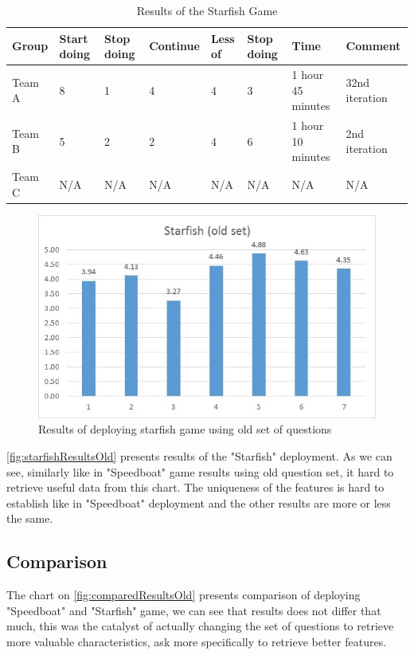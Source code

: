 \begin{table}[!htbp]
	\caption{Results of the Starfish Game}
	\label{tab:groups-starTeamResults}
	\begin{tabularx}{\textwidth}{|X|X|X|X|X|X|X|X|}
	\hline
		Group & Start doing & Stop doing & Continue & Less of &  Stop doing & Time & Comment\\ \hline
		Team A & 8 & 1 & 4 & 4 & 3 & 1 hour 45 minutes & 32nd iteration \\ \hline
		Team B & 5 & 2 & 2 & 4 & 6 & 1 hour 10 minutes & 2nd iteration \\ \hline
        Team C & N/A & N/A & N/A & N/A & N/A & N/A & N/A\\ \hline
	\end{tabularx}
\end{table}

\begin{figure}[!htbp]
\caption{Results of deploying starfish game using old set of questions}
\label{fig:starfishResultsOld}
\centering
\includegraphics[width=1\textwidth]{charts/starfishOldSet}
\end{figure}

\autoref{fig:starfishResultsOld} presents results of the "Starfish" deployment. As we can see, similarly like in "Speedboat" game results using old question set, it hard to retrieve useful data from this chart. The uniqueness of the features is hard to establish like in "Speedboat" deployment and the other results are more or less the same. 

\subsection{Comparison}
The chart on \autoref{fig:comparedResultsOld} presents comparison of deploying "Speedboat" and "Starfish" game, we can see that results does not differ that much, this was the catalyst of actually changing the set of questions to retrieve more valuable characteristics, ask more specifically to retrieve better features. 


